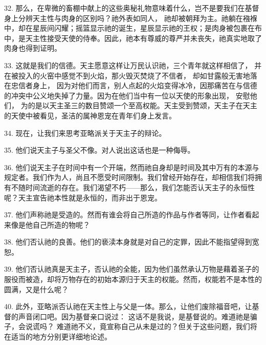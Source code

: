 32. 那么，在卑微的畜棚中献上的这些奥秘礼物意味着什么，岂不是要我们在基督身上分辨天主性与肉身的区别吗？祂外表如同人， 祂却被朝拜为主。祂躺在襁褓中，却在星辰间闪耀；摇篮显示祂的诞生，星辰显示祂的王权；是肉身被包裹在布中，是天主性接受天使的侍奉。因此，祂本有尊威的尊严并未丧失，祂真实地取了肉身也得到证明。\par

33. 这就是我们的信德。天主愿意这样让万民认识祂，三个青年就这样相信了， 并在被投入的火窑中感觉不到火焰，那火毁灭焚烧了不信者， 却如甘露般无害地落在忠信者身上， 因为对他们而言，别人点起的火焰变得冰冷，因那痛苦在与信德的冲突中公义地失掉了力量。因为在他们当中有一位以天使的形象出现， 安慰他们， 为的是以天主圣三的数目赞颂一个至高权能。天主受到赞颂，天主子在天主的天使中被看见，圣洁的属神恩宠在青年们身上发言。\par

\par

34. 现在，让我们来思考亚略派关于天主子的辩论。\par

35. 他们说天主子与圣父不像。对人说出这话也是一种侮辱。\par

36. 他们说天主子在时间中有一个开端，然而祂自身却是时间及其中万有的本源与规定者。我们作为人，尚且不愿受时间限制。我们曾经开始存在，却相信我们将拥有不随时间流逝的存在。我们渴望不朽——那么，我们怎能否认天主子的永恒性呢？天主宣告祂本性就是永恒的，而非出于恩宠。\par

37. 他们声称祂是受造的。然而有谁会将自己所造的作品与作者等同，让作者看起来像是他自己所造的物呢？\par

38. 他们否认祂的良善。他们的亵渎本身就是对自己的定罪，因此不能指望得到宽恕。\par

39. 他们否认祂真是天主子，否认祂的全能，因为他们虽然承认万物是藉着圣子的服役而被造，却将万物存在的初始本源归于天主的权能。然而，权能若不是本性的圆满，又是什么呢？\par

40. 此外，亚略派否认祂在天主性上与父是一体。那么，让他们废除福音吧，让基督的声音闭口吧。因为基督亲口说过：  这话不是我说，是基督说的。难道祂是骗子，会说谎吗？  难道祂不义，竟宣称自己从未是过的？但关于这些问题，我们将在适当的地方分别更详细地论述。\par

